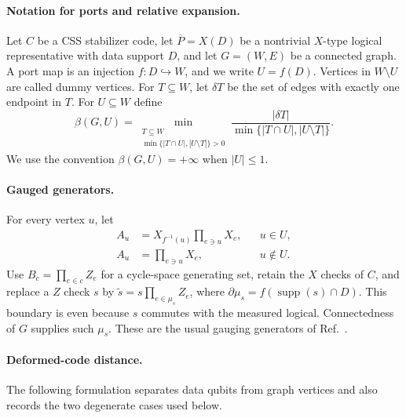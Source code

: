 \documentclass[aps,prx,reprint,superscriptaddress,nofootinbib,floatfix,longbibliography]{revtex4-2}
\theoremstyle{definition}
\begin{document}
\paragraph{Notation for ports and relative expansion.}
Let $C$ be a CSS stabilizer code, let $\overline P=X(D)$ be a nontrivial
$X$-type logical representative with data support $D$, and let
$G=(W,E)$ be a connected graph.  A port map is an injection
$f:D\hookrightarrow W$, and we write $U=f(D)$.  Vertices in $W\setminus U$
are called dummy vertices.  For $T\subseteq W$, let $\delta T$ be the set of
edges with exactly one endpoint in $T$.  For $U\subseteq W$ define
\begin{equation}
 \beta(G,U)=
 \min_{\substack{T\subseteq W\\
       \min\{|T\cap U|,|U\setminus T|\}>0}}
 \frac{|\delta T|}{\min\{|T\cap U|,|U\setminus T|\}}.
 \label{eq:relative-expansion}
\end{equation}
We use the convention $\beta(G,U)=+\infty$ when $|U|\leq 1$.

\paragraph{Gauged generators.}
For every vertex $u$, let
\begin{align}
 A_u&=X_{f^{-1}(u)}\prod_{e\ni u}X_e, && u\in U,\\
 A_u&=\prod_{e\ni u}X_e, && u\notin U.
\end{align}
Use $B_c=\prod_{e\in c}Z_e$ for a cycle-space generating set, retain the $X$ checks of $C$, and replace a $Z$ check $s$ by $\widetilde s=s\prod_{e\in\mu_s}Z_e$, where $\partial\mu_s=f(\operatorname{supp}(s)\cap D)$. This boundary is even because $s$ commutes with the measured logical. Connectedness of $G$ supplies such $\mu_s$. These are the usual gauging generators of Ref.~\cite{WilliamsonYoderGauging}.

\paragraph{Deformed-code distance.}
The following formulation separates data qubits from graph vertices and
also records the two degenerate cases used below.
\end{document}
